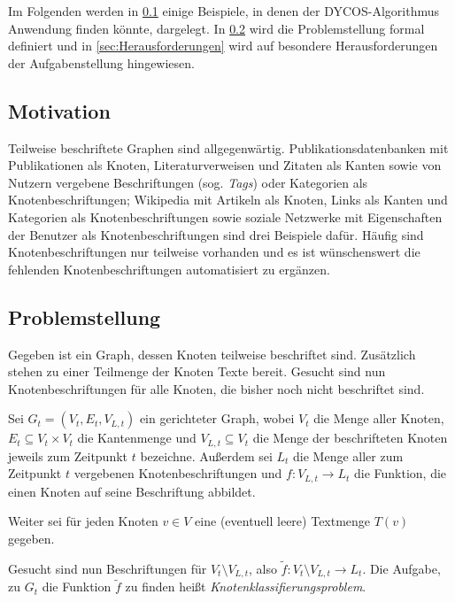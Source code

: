 Im Folgenden werden in \cref{sec:Motivation} einige Beispiele, in denen
der DYCOS-Algorithmus Anwendung finden könnte, dargelegt. In
\cref{sec:Problemstellung} wird die Problemstellung formal definiert
und in \cref{sec:Herausforderungen} wird auf besondere Herausforderungen der
Aufgabenstellung hingewiesen.

\subsection{Motivation}\label{sec:Motivation}
Teilweise beschriftete Graphen sind allgegenwärtig. Publikationsdatenbanken mit
Publikationen als Knoten, Literaturverweisen und Zitaten als Kanten sowie von
Nutzern vergebene Beschriftungen (sog. {\it Tags}) oder Kategorien als
Knotenbeschriftungen; Wikipedia mit Artikeln als Knoten, Links als Kanten und
Kategorien als Knotenbeschriftungen sowie soziale Netzwerke mit Eigenschaften
der Benutzer als Knotenbeschriftungen sind drei Beispiele dafür. Häufig sind
Knotenbeschriftungen nur teilweise vorhanden und es ist wünschenswert die
fehlenden Knotenbeschriftungen automatisiert zu ergänzen.

\subsection{Problemstellung}\label{sec:Problemstellung}
Gegeben ist ein Graph, dessen Knoten teilweise beschriftet sind. Zusätzlich
stehen zu einer Teilmenge der Knoten Texte bereit. Gesucht sind nun
Knotenbeschriftungen für alle Knoten, die bisher noch nicht beschriftet sind.\\

\begin{definition}[Knotenklassifierungsproblem]\label{def:Knotenklassifizierungsproblem}
    Sei $G_t = (V_t, E_t, V_{L,t})$ ein gerichteter Graph, wobei $V_t$ die
    Menge aller Knoten, $E_t \subseteq V_t \times V_t$ die Kantenmenge und
    $V_{L,t} \subseteq V_t$ die Menge der beschrifteten Knoten jeweils zum
    Zeitpunkt $t$ bezeichne. Außerdem sei $L_t$ die Menge aller zum Zeitpunkt
    $t$ vergebenen Knotenbeschriftungen und $f:V_{L,t} \rightarrow L_t$ die
    Funktion, die einen Knoten auf seine Beschriftung abbildet.

    Weiter sei für jeden Knoten $v \in V$ eine (eventuell leere) Textmenge
    $T(v)$ gegeben.

    Gesucht sind nun Beschriftungen für $V_t \setminus V_{L,t}$, also
    $\tilde{f}: V_t \setminus V_{L,t} \rightarrow L_t$. Die Aufgabe, zu $G_t$
    die Funktion $\tilde{f}$ zu finden heißt
    \textit{Knotenklassifierungsproblem}.
\end{definition}

